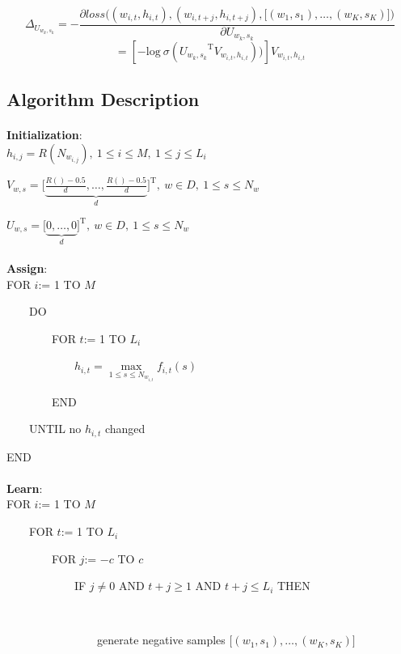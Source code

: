 \documentclass[12pt,a4paper,twoside]{book}
\begin{document}
$$\Delta_{U_{w_k,s_k}} = -\frac{\partial loss\bigg ( (w_{i,t},h_{i,t}),(w_{i,t+j},h_{i,t+j}),\big [(w_1,s_1),\ldots,(w_K,s_K)\big ]\bigg )}{\partial U_{w_k,s_k}}$$
$$=[-\mathrm{log}\ \sigma({U_{w_k,s_k}}^{\mathrm{T}}V_{w_{i,t},h_{i,t}}))]V_{w_{i,t},h_{i,t}}$$

\subsection{Algorithm Description}
\paragraph{} \textbf{Initialization}: \\

$h_{i,j} = R(N_{w_{i,j}}),  \ 1\leq i \leq M,  \ 1\leq j\leq L_i$

$V_{w,s} = \Big[\underbrace{\frac{R()-0.5}{d},\ldots,\frac{R()-0.5}{d}}_{d}\Big]^{\mathrm{T}}, \ w\in D, \  1\leq s\leq N_w$

$U_{w,s} = \Big[\underbrace{0,\ldots,0}_{d}\Big]^{\mathrm{T}},  \ w\in D, \  1\leq s\leq N_w$
\paragraph{} \textbf{Assign}:\\

FOR $i$:= 1 TO $M$

\ \ \ \ DO

\ \ \ \ \ \ \ \ FOR $t$:= 1 TO $L_i$

\ \ \ \ \ \ \ \ \ \ \ \ $h_{i,t} = \max\limits_{1\leq s\leq N_{w_{i,t}}} f_{i,t}(s)$

\ \ \ \ \ \ \ \ END

\ \ \ \ UNTIL no $h_{i,t}$ changed

END
\paragraph{} \textbf{Learn}:\\

FOR $i$:= 1 TO $M$

\ \ \ \ FOR $t$:= 1 TO $L_i$

\ \ \ \ \ \ \ \ FOR $j$:= $-c$ TO $c$

\ \ \ \ \ \ \ \ \ \ \ \ IF $j\neq 0$ AND $t+j\geq1$ AND $t+j\leq L_i$ THEN

\ \ \ \ \ \ \ \ \ \ \ \ \ \ \ \

\ \ \ \ \ \ \ \ \ \ \ \ \ \ \ \ generate negative samples $\big [(w_1,s_1),\ldots,(w_K,s_K)\big ]$
\end{document}
